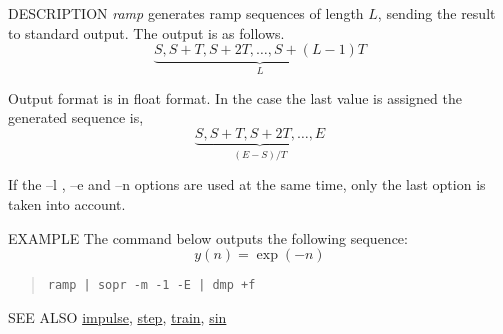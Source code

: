 \begin{synopsis}
\item[ramp] [ --l $L$ ] [ --n $N$ ] [ --s $S$ ] [ --e $E$ ] [ --t $T$ ]
\end{synopsis}

\begin{qsection}{DESCRIPTION}
{\em ramp} generates ramp sequences of length $L$, 
sending the result to standard output. 
The output is as follows.
\begin{displaymath}
\underbrace{S, S+T, S+2T,  \dots, S+(L-1)T}_{L}
\end{displaymath}
\par
Output format is in float format.
In the case the last value is assigned 
the generated sequence is,
\begin{displaymath}
\underbrace{S, S+T, S+2T,  \dots, E}_{(E-S)/T}
\end{displaymath}
\par
If the --l , --e and --n options are used
at the same time, only the last option is taken into account.
\end{qsection}

\begin{options}
\end{options}

\begin{qsection}{EXAMPLE}
The command below outputs the following sequence:
\begin{displaymath}
  y(n)=\exp(-n)
\end{displaymath}
\begin{quote}
\verb!ramp | sopr -m -1 -E | dmp +f!
\end{quote}
\end{qsection}

\begin{qsection}{SEE ALSO}
\hyperlink{impulse}{impulse},
\hyperlink{step}{step},
\hyperlink{train}{train},
\hyperlink{sin}{sin}
\end{qsection}

